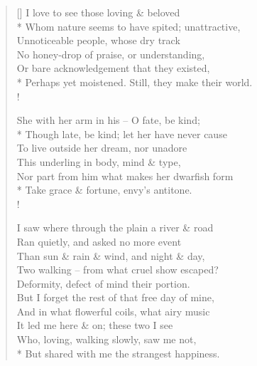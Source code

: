 \documentclass[MAIN]{subfiles}
\begin{document}
\settowidth{\versewidth}{Perhaps yet moistened. Still, they make their world.}
\begin{verse}[\versewidth]
I love to see those loving \& beloved\\*
Whom nature seems to have spited; unattractive,\\
Unnoticeable people, whose dry track\\
No honey-drop of praise, or understanding,\\
Or bare acknowledgement that they existed,\\*
Perhaps yet moistened. Still, they make their world.\\!

She with her arm in his -- O fate, be kind;\\*
Though late, be kind; let her have never cause\\
To live outside her dream, nor unadore\\
This underling in body, mind \& type,\\
Nor part from him what makes her dwarfish form\\*
Take grace \& fortune, envy's antitone.\\!

I saw where through the plain a river \& road\\
Ran quietly, and asked no more event\\
Than sun \& rain \& wind, and night \& day,\\
Two walking -- from what cruel show escaped?\\
Deformity, defect of mind their portion.\\
But I forget the rest of that free day of mine,\\
And in what flowerful coils, what airy music\\
It led me here \& on; these two I see\\
Who, loving, walking slowly, saw me not,\\*
But shared with me the strangest happiness.
\end{verse}
\end{document}
